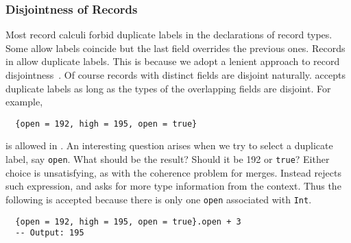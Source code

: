 \begin{comment}
\subsubsection{Restriction via Subtyping}

Unlike most record systems, restriction is not a primitive operation in \name.
Instead, \name uses subtyping for restriction. Combined with disjoint
quantification, we can encode a \lstinline{remove} function that removes a given
field from a record:
\lstinline{remove} takes a value x which contains a record of type
\lstinline${low : Int}$ as well as some extra information of type \lstinline{B}.
The disjointness constraint ensures that the value of type \lstinline{B} does
not contain a record with type \lstinline${low : Int}$. The following examples
shows removing the \lstinline{low} field:
\end{comment}


\subsubsection{Disjointness of Records}

Most record calculi forbid duplicate labels in the declarations of record types.
Some allow labels coincide but the last field overrides the previous ones.
Records in \name allow duplicate labels. This is because we adopt a lenient
approach to record disjointness~\cite{alpuimdisjoint}. Of course records with
distinct fields are disjoint naturally. \name accepts duplicate labels as long
as the types of the overlapping fields are disjoint. For example,
\begin{lstlisting}
  {open = 192, high = 195, open = true}
\end{lstlisting}
is allowed in \name. An interesting question arises when we try to select a
duplicate label, say \lstinline{open}. What should be the result? Should it be
192 or \lstinline{true}? Either choice is unsatisfying, as with the coherence
problem for merges. Instead \name rejects such expression, and asks for more
type information from the context. Thus the following is accepted because there
is only one \lstinline{open} associated with \lstinline{Int}.
\begin{lstlisting}
  {open = 192, high = 195, open = true}.open + 3
  -- Output: 195
\end{lstlisting}
